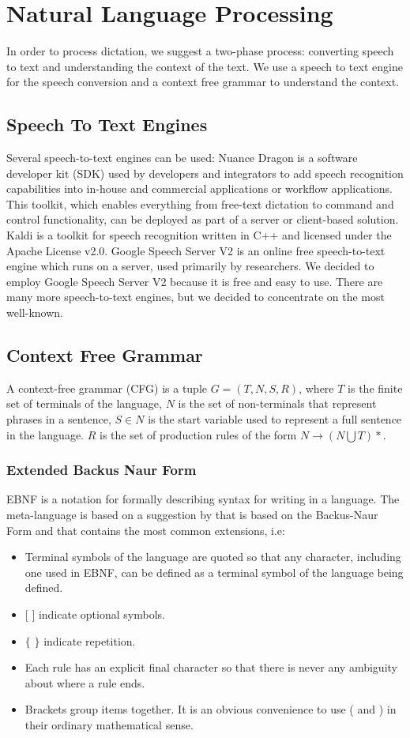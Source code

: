 \section{Natural Language Processing}
In order to process dictation, we suggest a two-phase process: converting speech to text and understanding the context of the text. We use a speech to text engine for the speech conversion and a context free grammar to understand the context.
\subsection{Speech To Text Engines}
Several speech-to-text engines can be used: Nuance Dragon \citet{Nuance14} is a software developer kit (SDK) used by developers and integrators to add speech recognition capabilities into in-house and commercial applications or workflow applications. This toolkit, which enables everything from free-text dictation to command and control functionality, can be deployed as part of a server or client-based solution. Kaldi \citet{PoveyASRU2011} is a toolkit for speech recognition written in C++ and licensed under the Apache License v2.0. Google Speech Server V2 \citet{google15} is an online free speech-to-text engine which runs on a server, used primarily by researchers. We decided to employ Google Speech Server V2 because it is free and easy to use. There are many more speech-to-text engines, but we decided to concentrate on the most well-known.
\subsection{Context Free Grammar}
A context-free grammar (CFG) is a tuple $ G=(T,N,S,R) $, where $ T $ is the finite set of  terminals of the language, $ N $ is the set of non-terminals that represent phrases in a sentence, $ S \in N $ is the start variable used to represent a full sentence in the language. $ R $ is the set of production rules of the form $ N \rightarrow (N \bigcup T)* $.
\subsubsection{Extended Backus Naur Form}
EBNF is a notation for formally describing syntax for writing in a language. The meta-language is based on a suggestion by \citet{Wirth77} that is based on the Backus-Naur Form and that contains the most common extensions, i.e:
\begin{itemize}
	\item Terminal symbols of the language are quoted so that any character,
	including one used in EBNF, can be defined as a terminal symbol of
	the language being defined.
	\item $ [ $ $ ] $ indicate optional symbols.
	\item $ \{ $ $ \} $ indicate repetition.
	\item Each rule has an explicit final character so that there is never any
	ambiguity about where a rule ends.
	\item Brackets group items together. It is an obvious convenience to use ( and ) in their ordinary mathematical sense.
\end{itemize}
